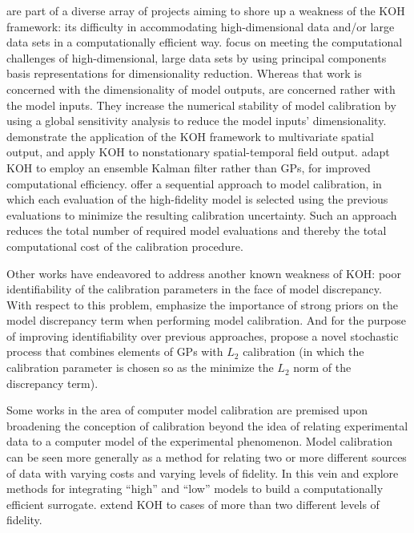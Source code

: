 \documentclass[12pt]{article}
\begin{document}
\citet{Paulo2012} are part of a diverse array of projects aiming to shore up a weakness of the KOH framework: its difficulty in accommodating high-dimensional data and/or large data sets in a computationally efficient way.
\citet{Higdon2008a} focus on meeting the computational challenges of high-dimensional, large data sets by using principal components basis representations for dimensionality reduction.
Whereas that work is concerned with the dimensionality of model outputs, \citet{Drignei2012} are concerned rather with the model inputs.
They increase the numerical stability of model calibration by using a global sensitivity analysis to reduce the model inputs' dimensionality.
\citet{Bhat2010} demonstrate the application of the KOH framework to multivariate spatial output, and \citet{Pratola2013} apply KOH to nonstationary spatial-temporal field output.
\citet{Higdon2013} adapt KOH to employ an ensemble Kalman filter rather than GPs, for improved computational efficiency.
\citet{Yuan2013} offer a sequential approach to model calibration, in which each evaluation of the high-fidelity model is selected using the previous evaluations to minimize the resulting calibration uncertainty. 
Such an approach reduces the total number of required model evaluations and thereby the total computational cost of the calibration procedure.

Other works have endeavored to address another known weakness of KOH: poor identifiability of the calibration parameters in the face of model discrepancy.
With respect to this problem, \citet{Brynjarsdottir2014} emphasize the importance of strong priors on the model discrepancy term when performing model calibration.
And for the purpose of improving identifiability over previous approaches, \citet{Gu2018} propose a novel stochastic process that combines elements of GPs with $L_2$ calibration (in which the calibration parameter is chosen so as the minimize the $L_2$ norm of the discrepancy term).

Some works in the area of computer model calibration are premised upon broadening the conception of calibration beyond the idea of relating experimental data to a computer model of the experimental phenomenon.
Model calibration can be seen more generally as a method for relating two or more different sources of data with varying costs and varying levels of fidelity.
In this vein \citet{Kennedy2000} and \citet{Qian2006} explore methods for integrating ``high'' and ``low'' models to build a computationally efficient surrogate.
\citet{Goh2013} extend KOH to cases of more than two different levels of fidelity.
\end{document}
